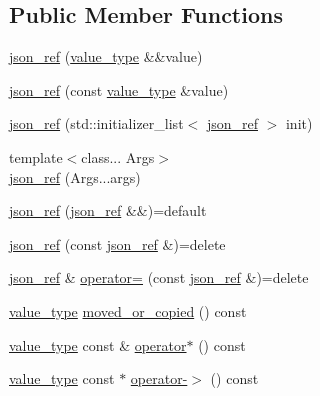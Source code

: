 \subsection*{Public Member Functions}
\begin{DoxyCompactItemize}
\item 
\hyperlink{classnlohmann_1_1detail_1_1json__ref_ae1adf5bcee8b6fa0c358710604fb1938}{json\+\_\+ref} (\hyperlink{classnlohmann_1_1detail_1_1json__ref_a78d76cf288141049568c0d670ed670ef}{value\+\_\+type} \&\&value)
\item 
\hyperlink{classnlohmann_1_1detail_1_1json__ref_a8c3eb3c6e952ed0cd7eece586ab4047c}{json\+\_\+ref} (const \hyperlink{classnlohmann_1_1detail_1_1json__ref_a78d76cf288141049568c0d670ed670ef}{value\+\_\+type} \&value)
\item 
\hyperlink{classnlohmann_1_1detail_1_1json__ref_adfba2db547283a7c6a5df9a32e72efc5}{json\+\_\+ref} (std\+::initializer\+\_\+list$<$ \hyperlink{classnlohmann_1_1detail_1_1json__ref}{json\+\_\+ref} $>$ init)
\item 
{\footnotesize template$<$class... Args$>$ }\\\hyperlink{classnlohmann_1_1detail_1_1json__ref_a8ab4f5a2bed3c0407f8e769d6e8260ee}{json\+\_\+ref} (Args...\+args)
\item 
\hyperlink{classnlohmann_1_1detail_1_1json__ref_a59221ddbd756ca24d289c787fab38dbc}{json\+\_\+ref} (\hyperlink{classnlohmann_1_1detail_1_1json__ref}{json\+\_\+ref} \&\&)=default
\item 
\hyperlink{classnlohmann_1_1detail_1_1json__ref_a4c68db46934e03588bbd73b00147c0dd}{json\+\_\+ref} (const \hyperlink{classnlohmann_1_1detail_1_1json__ref}{json\+\_\+ref} \&)=delete
\item 
\hyperlink{classnlohmann_1_1detail_1_1json__ref}{json\+\_\+ref} \& \hyperlink{classnlohmann_1_1detail_1_1json__ref_a98956ba676b1ae16b62346f9c4fb752e}{operator=} (const \hyperlink{classnlohmann_1_1detail_1_1json__ref}{json\+\_\+ref} \&)=delete
\item 
\hyperlink{classnlohmann_1_1detail_1_1json__ref_a78d76cf288141049568c0d670ed670ef}{value\+\_\+type} \hyperlink{classnlohmann_1_1detail_1_1json__ref_ab82818e9b8cc63cb76e61fe6b68959a5}{moved\+\_\+or\+\_\+copied} () const 
\item 
\hyperlink{classnlohmann_1_1detail_1_1json__ref_a78d76cf288141049568c0d670ed670ef}{value\+\_\+type} const \& \hyperlink{classnlohmann_1_1detail_1_1json__ref_adec75260903212a3bf1235fced3f2e51}{operator$\ast$} () const 
\item 
\hyperlink{classnlohmann_1_1detail_1_1json__ref_a78d76cf288141049568c0d670ed670ef}{value\+\_\+type} const $\ast$ \hyperlink{classnlohmann_1_1detail_1_1json__ref_ae4492a0e856ba9bb8739e9bba988a8c6}{operator-\/$>$} () const 
\end{DoxyCompactItemize}


